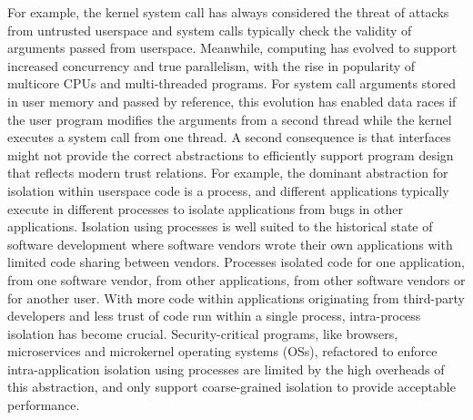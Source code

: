 For example, the kernel system call has always considered the threat
of attacks from untrusted userspace and system calls typically check the 
validity of arguments passed from userspace.
Meanwhile, computing has evolved to support increased concurrency and true 
parallelism, with the rise in popularity of multicore CPUs and multi-threaded 
programs.
For system call arguments stored in user memory and passed by reference,
this evolution has enabled data races if the user program
modifies the arguments from a second thread while the kernel executes
a system call from one thread.
A second consequence is that interfaces might not provide the correct
abstractions to efficiently support program design that reflects
modern trust relations.
For example, the dominant abstraction for isolation within userspace code
is a process, and different applications typically execute in different 
processes to isolate applications from bugs in other applications.
Isolation using processes is well suited to the historical state of software
development where software vendors wrote their own applications with limited
code sharing between vendors.
Processes isolated code for one application, from one software vendor,
from other applications, from other software vendors or for another user.
With more code within applications originating from third-party developers
and less trust of code run within a single process, intra-process isolation
has become crucial.
Security-critical programs, like browsers, microservices and microkernel
operating systems (OSs), refactored to enforce intra-application isolation 
using processes are limited by the high overheads of this abstraction, and 
only support coarse-grained isolation to provide acceptable performance.


